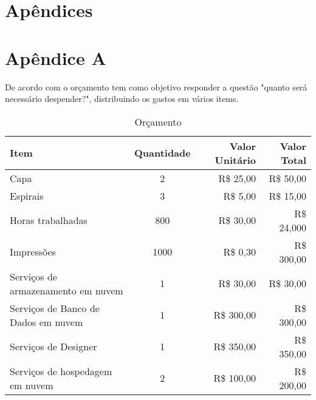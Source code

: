 \appendix

\chapter*{Apêndices}

\chapter*{Apêndice A}
De acordo com \citep[p. 128]{LAKATOS2021:metodologia} o orçamento
tem como objetivo responder a questão "quanto será necessário
despender?", distribuindo os gastos em vários items.

\begin{table}[H]
    \caption{Orçamento}
    \label{quad:orcamento}
    \begin{tabular}{|p{6.4cm}|c|r|r|}
        \hline
        {\textbf{Item}}                         & {\textbf{Quantidade}} & {\textbf{Valor Unitário}} & {\textbf{Valor Total}} \\ \hline
        {{Capa}}                                & {2}                   & {R\$ 25,00 }              & {R\$ 50,00}            \\ \hline
        {{Espirais}}                            & {3}                   & {R\$ 5,00 }               & {R\$ 15,00}            \\ \hline
        {{Horas trabalhadas}}                   & {800}                 & {R\$ 30,00 }              & {R\$ 24,000}           \\ \hline
        {{Impressões}}                          & {1000}                & {R\$ 0,30 }               & {R\$ 300,00}           \\ \hline
        {{Serviços de armazenamento em nuvem}}  & {1}                   & {R\$ 30,00 }              & {R\$ 30,00}            \\ \hline
        {{Serviços de Banco de Dados em nuvem}} & {1}                   & {R\$ 300,00 }             & {R\$ 300,00}           \\ \hline
        {{Serviços de Designer}}                & {1}                   & {R\$ 350,00 }             & {R\$ 350,00}           \\ \hline
        {{Serviços de hospedagem em nuvem}}     & {2}                   & {R\$ 100,00 }             & {R\$ 200,00}           \\ \hline
    \end{tabular}
\end{table}

